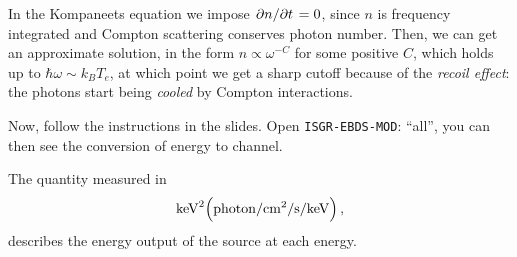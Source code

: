 \documentclass[main.tex]{subfiles}
\begin{document}
In the Kompaneets equation we impose \(\pdv*{n}{t} = 0\), since \(n\) is frequency integrated and Compton scattering conserves photon number. Then, we can get an approximate solution, in the form \(n \propto \omega^{-C}\) for some positive \(C\), which holds up to \(\hbar \omega \sim k_B T_e\), at which point we get a sharp cutoff because of the \emph{recoil effect}: the photons start being \emph{cooled} by Compton interactions. 

Now, follow the instructions in the slides. Open \texttt{ISGR-EBDS-MOD}: ``all'', you can then see the conversion of energy to channel.

The quantity measured in 
%
\begin{equation}
  \SI{}{keV}^2 \qty(\SI{}{photon / cm^2 / s / keV})
\,,
\end{equation}
%
describes the energy output of the source at each energy.
\end{document}
